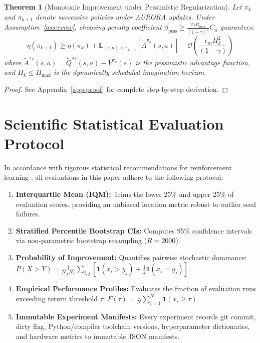 \documentclass[11pt,a4paper]{article}
\newtheorem{theorem}{Theorem}
\theoremstyle{definition}
\theoremstyle{remark}
\begin{document}
\begin{theorem}[Monotonic Improvement under Pessimistic Regularization]
\label{thm:monotonic}
Let $\pi_k$ and $\pi_{k+1}$ denote successive policies under AURORA updates. Under Assumption~\ref{ass:error}, choosing penalty coefficient $\beta_{\text{pess}} \ge \frac{2 \gamma R_{\max}}{(1 - \gamma)^2} C_u$ guarantees:
\begin{equation}
    \eta(\pi_{k+1}) \ge \eta(\pi_k) + \mathbb{E}_{(s, a) \sim \pi_{k+1}} \left[ \tilde{A}^{\pi_k}(s, a) \right] - \mathcal{O}\left( \frac{\epsilon_m H_k^2}{(1 - \gamma)} \right)
\end{equation}
where $\tilde{A}^{\pi_k}(s, a) = \tilde{Q}^{\pi_k}(s, a) - V^{\pi_k}(s)$ is the pessimistic advantage function, and $H_k \le H_{\max}$ is the dynamically scheduled imagination horizon.
\end{theorem}

\begin{proof}
See Appendix~\ref{app:proof} for complete step-by-step derivation.
\end{proof}

\section{Scientific Statistical Evaluation Protocol}
\label{sec:evaluation}

In accordance with rigorous statistical recommendations for reinforcement learning \citep{agarwal2021deep}, all evaluations in this paper adhere to the following protocol:
\begin{enumerate}
    \item \textbf{Interquartile Mean (IQM):} Trims the lower 25\% and upper 25\% of evaluation scores, providing an unbiased location metric robust to outlier seed failures.
    \item \textbf{Stratified Percentile Bootstrap CIs:} Computes 95\% confidence intervals via non-parametric bootstrap resampling ($R=2000$).
    \item \textbf{Probability of Improvement:} Quantifies pairwise stochastic dominance: $P(X > Y) = \frac{1}{N_X N_Y} \sum_{i,j} \left[ \mathbf{1}(x_i > y_j) + \frac{1}{2} \mathbf{1}(x_i = y_j) \right]$.
    \item \textbf{Empirical Performance Profiles:} Evaluates the fraction of evaluation runs exceeding return threshold $\tau$: $F(\tau) = \frac{1}{N} \sum_{i=1}^N \mathbf{1}(x_i \ge \tau)$.
    \item \textbf{Immutable Experiment Manifests:} Every experiment records git commit, dirty flag, Python/compiler toolchain versions, hyperparameter dictionaries, and hardware metrics to immutable JSON manifests.
\end{enumerate}
\end{document}
